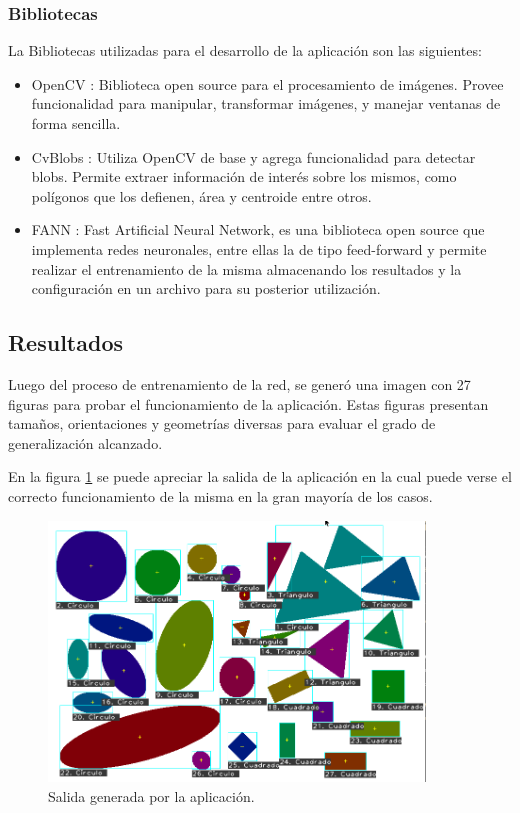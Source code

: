 \documentclass[pdftex,a4paper,10.5pt]{article}
\begin{document}
\subsubsection{Bibliotecas}
La Bibliotecas utilizadas para el desarrollo de la aplicaci\'on son las
siguientes:
\begin{itemize}
	\item	OpenCV \cite{openCV,openCVBook} : Biblioteca open source para el procesamiento de im\'agenes.
	Provee funcionalidad para manipular, transformar im\'agenes, y manejar ventanas de forma sencilla.
	\item	CvBlobs \cite{cvBlob}: Utiliza OpenCV de base y agrega funcionalidad para
	detectar blobs. Permite extraer informaci\'on de inter\'es sobre los mismos, como pol\'igonos que los 
	defienen, \'area y centroide entre otros.
	\item	FANN \cite{fann}: Fast Artificial Neural Network, es una biblioteca open source
	que implementa redes neuronales, entre ellas la de tipo feed-forward y permite realizar el entrenamiento      	de la misma almacenando los resultados y la configuraci\'on en un archivo para su posterior
	utilizaci\'on.
\end{itemize}
       

\subsection{Resultados} %

Luego del proceso de entrenamiento de la red, se gener\'o una imagen con 27 figuras para probar el funcionamiento de la aplicaci\'on. Estas figuras presentan tama\~nos, orientaciones y geometr\'ias diversas para evaluar el grado de generalizaci\'on alcanzado.

En la figura \ref{salida_ejemlpo} se puede apreciar la salida de la aplicaci\'on en la cual puede verse el correcto funcionamiento de la misma en la gran mayor\'ia de los casos.

 	           \begin{figure}[H]

	                  \begin{center}
	                    \includegraphics[width=10cm]{salida.png}
	                    \caption{\label{salida_ejemlpo} Salida generada por la aplicaci\'on. }
	                  \end{center}
	            \end{figure}
\end{document}
